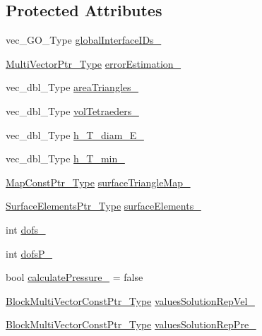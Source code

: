 \subsection*{Protected Attributes}
\begin{DoxyCompactItemize}
\item 
vec\+\_\+\+G\+O\+\_\+\+Type \hyperlink{classFEDD_1_1ErrorEstimation_afb6eb1618023286bcbd18b59023752fb}{global\+Interface\+I\+Ds\+\_\+}
\item 
\hyperlink{classFEDD_1_1ErrorEstimation_a5882ff373bf8c409b407b4fd1f42bda0}{Multi\+Vector\+Ptr\+\_\+\+Type} \hyperlink{classFEDD_1_1ErrorEstimation_a522bd10ea24ae844bd38ad644fec5dc4}{error\+Estimation\+\_\+}
\item 
vec\+\_\+dbl\+\_\+\+Type \hyperlink{classFEDD_1_1ErrorEstimation_ae0395855399463136ef23963c50d92fb}{area\+Triangles\+\_\+}
\item 
vec\+\_\+dbl\+\_\+\+Type \hyperlink{classFEDD_1_1ErrorEstimation_a85be16035eebc82df031a58d7cdf8e8e}{vol\+Tetraeders\+\_\+}
\item 
vec\+\_\+dbl\+\_\+\+Type \hyperlink{classFEDD_1_1ErrorEstimation_a984034d2b0306ed7c194c6ca5dbfbc40}{h\+\_\+\+T\+\_\+diam\+\_\+\+E\+\_\+}
\item 
vec\+\_\+dbl\+\_\+\+Type \hyperlink{classFEDD_1_1ErrorEstimation_a641cf149d34e2423bf9cbba020cb234a}{h\+\_\+\+T\+\_\+min\+\_\+}
\item 
\hyperlink{classFEDD_1_1ErrorEstimation_ad45c898ab6123b9e7d5efbc0e5365ccf}{Map\+Const\+Ptr\+\_\+\+Type} \hyperlink{classFEDD_1_1ErrorEstimation_a76311ceaa85a3e2f8c1abccb2d62a63b}{surface\+Triangle\+Map\+\_\+}
\item 
\hyperlink{classFEDD_1_1ErrorEstimation_a391a95553efe67657e031e1af4ec02cc}{Surface\+Elements\+Ptr\+\_\+\+Type} \hyperlink{classFEDD_1_1ErrorEstimation_ac39c2e2d1394c83ce618d276adf91639}{surface\+Elements\+\_\+}
\item 
int \hyperlink{classFEDD_1_1ErrorEstimation_a6c48449bc47150de2da8526dfc0c4cb0}{dofs\+\_\+}
\item 
int \hyperlink{classFEDD_1_1ErrorEstimation_a43149de05f9bbcb89792f6d8e8fa39ec}{dofs\+P\+\_\+}
\item 
bool \hyperlink{classFEDD_1_1ErrorEstimation_a05c5de4a5cb4ffc3a3231ea9f86a9610}{calculate\+Pressure\+\_\+} = false
\item 
\hyperlink{classFEDD_1_1ErrorEstimation_a8a53d809dfcf71abaffe46f85e6b4aa1}{Block\+Multi\+Vector\+Const\+Ptr\+\_\+\+Type} \hyperlink{classFEDD_1_1ErrorEstimation_aa8db6776c27cc0a72e1b0709a8bc736c}{values\+Solution\+Rep\+Vel\+\_\+}
\item 
\hyperlink{classFEDD_1_1ErrorEstimation_a8a53d809dfcf71abaffe46f85e6b4aa1}{Block\+Multi\+Vector\+Const\+Ptr\+\_\+\+Type} \hyperlink{classFEDD_1_1ErrorEstimation_a253bb0380e34ce735919c79ba9ddd4d4}{values\+Solution\+Rep\+Pre\+\_\+}
\end{DoxyCompactItemize}


